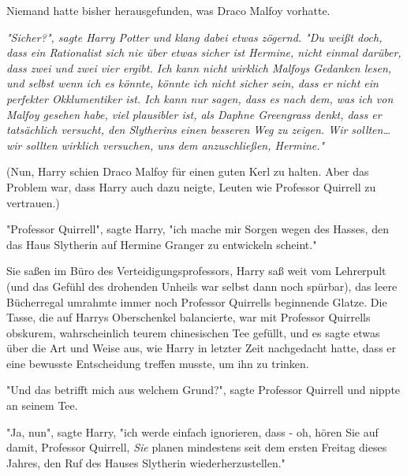 {Niemand hatte bisher herausgefunden, was Draco Malfoy vorhatte.

\emph{\emph{"Sicher?", sagte Harry Potter und klang dabei etwas zögernd. "Du weißt doch, dass ein Rationalist sich nie über etwas sicher ist Hermine, nicht einmal darüber, dass zwei und zwei vier ergibt. Ich kann nicht wirklich Malfoys Gedanken lesen, und selbst wenn ich es könnte, könnte ich nicht sicher sein, dass er nicht ein perfekter Okklumentiker ist. Ich kann nur sagen, dass es nach dem, was ich von Malfoy gesehen habe, viel plausibler ist, als Daphne Greengrass denkt, dass er tatsächlich versucht, den Slytherins einen besseren Weg zu zeigen. Wir sollten… wir sollten wirklich versuchen, uns dem anzuschließen, Hermine."}}

(Nun, Harry schien Draco Malfoy für einen guten Kerl zu halten. Aber das Problem war, dass Harry auch dazu neigte, Leuten wie Professor Quirrell zu vertrauen.)

"Professor Quirrell", sagte Harry, "ich mache mir Sorgen wegen des Hasses, den das Haus Slytherin auf Hermine Granger zu entwickeln scheint."

Sie saßen im Büro des Verteidigungsprofessors, Harry saß weit vom Lehrerpult (und das Gefühl des drohenden Unheils war selbst dann noch spürbar), das leere Bücherregal umrahmte immer noch Professor Quirrells beginnende Glatze. Die Tasse, die auf Harrys Oberschenkel balancierte, war mit Professor Quirrells obskurem, wahrscheinlich teurem chinesischen Tee gefüllt, und es sagte etwas über die Art und Weise aus, wie Harry in letzter Zeit nachgedacht hatte, dass er eine bewusste Entscheidung treffen musste, um ihn zu trinken.

"Und das betrifft mich aus welchem Grund?", sagte Professor Quirrell und nippte an seinem Tee.

"Ja, nun", sagte Harry, "ich werde einfach ignorieren, dass - oh, hören Sie auf damit, Professor Quirrell, \emph{Sie} planen mindestens seit dem ersten Freitag dieses Jahres, den Ruf des Hauses Slytherin wiederherzustellen."

}
